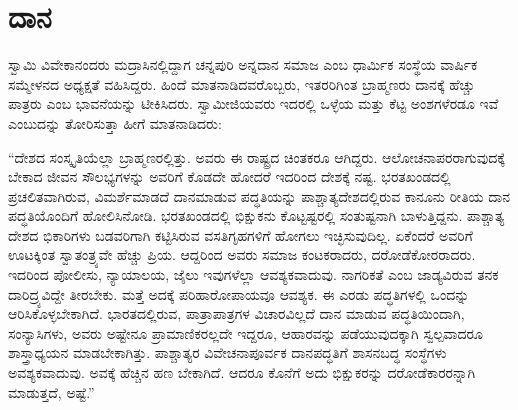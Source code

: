 
\chapter{ದಾನ}

ಸ್ವಾಮಿ ವಿವೇಕಾನಂದರು ಮದ್ರಾಸಿನಲ್ಲಿದ್ದಾಗ ಚನ್ನಪುರಿ ಅನ್ನದಾನ ಸಮಾಜ ಎಂಬ ಧಾರ್ಮಿಕ ಸಂಸ್ಥೆಯ ವಾರ್ಷಿಕ ಸಮ್ಮೇಳನದ ಅಧ್ಯಕ್ಷತೆ ವಹಿಸಿದ್ದರು. ಹಿಂದೆ ಮಾತನಾಡಿದವರೊಬ್ಬರು, ಇತರರಿಗಿಂತ ಬ್ರಾಹ್ಮಣರು ದಾನಕ್ಕೆ ಹೆಚ್ಚು ಪಾತ್ರರು ಎಂಬ ಭಾವನೆಯನ್ನು ಟೀಕಿಸಿದರು. ಸ್ವಾಮೀಜಿಯವರು ಇದರಲ್ಲಿ ಒಳ್ಳೆಯ ಮತ್ತು ಕೆಟ್ಟ ಅಂಶಗಳೆರಡೂ ಇವೆ ಎಂಬುದನ್ನು ತೋರಿಸುತ್ತಾ ಹೀಗೆ ಮಾತನಾಡಿದರು:

“ದೇಶದ ಸಂಸ್ಕೃತಿಯೆಲ್ಲಾ ಬ್ರಾಹ್ಮಣರಲ್ಲಿತ್ತು. ಅವರು ಈ ರಾಷ್ಟ್ರದ ಚಿಂತಕರೂ ಆಗಿದ್ದರು. ಆಲೋಚನಾಪರರಾಗುವುದಕ್ಕೆ ಬೇಕಾದ ಜೀವನ ಸೌಲಭ್ಯಗಳನ್ನು ಅವರಿಗೆ ಕೊಡದೇ ಹೋದರೆ ಇದರಿಂದ ದೇಶಕ್ಕೆ ನಷ್ಟ. ಭರತಖಂಡದಲ್ಲಿ ಪ್ರಚಲಿತವಾಗಿರುವ, ವಿಮರ್ಶೆಮಾಡದೆ ದಾನಮಾಡುವ ಪದ್ಧತಿಯನ್ನು ಪಾಶ್ಚಾತ್ಯದೇಶದಲ್ಲಿರುವ ಕಾನೂನು ರೀತಿಯ ದಾನ ಪದ್ಧತಿಯೊಂದಿಗೆ ಹೋಲಿಸಿನೋಡಿ. ಭರತಖಂಡದಲ್ಲಿ ಭಿಕ್ಷುಕನು ಕೊಟ್ಟಷ್ಟರಲ್ಲಿ ಸಂತುಷ್ಟನಾಗಿ ಬಾಳುತ್ತಿದ್ದನು. ಪಾಶ್ಚಾತ್ಯ ದೇಶದ ಭಿಕಾರಿಗಳು ಬಡವರಿಗಾಗಿ ಕಟ್ಟಿಸಿರುವ ವಸತಿಗೃಹಗಳಿಗೆ ಹೋಗಲು ಇಚ್ಛಿಸುವುದಿಲ್ಲ. ಏಕೆಂದರೆ ಅವರಿಗೆ ಊಟಕ್ಕಿಂತ ಸ್ವಾತಂತ್ರ್ಯವೇ ಹೆಚ್ಚು ಪ್ರಿಯ. ಆದ್ದರಿಂದ ಅವರು ಸಮಾಜ ಕಂಟಕರಾದರು, ದರೋಡೆಕೋರರಾದರು. ಇದರಿಂದ ಪೋಲೀಸು, ನ್ಯಾಯಾಲಯ, ಜೈಲು ಇವುಗಳೆಲ್ಲಾ ಆವಶ್ಯಕವಾದುವು. ನಾಗರಿಕತೆ ಎಂಬ ಜಾಡ್ಯವಿರುವ ತನಕ ದಾರಿದ್ರ್ಯವಿದ್ದೇ ತೀರಬೇಕು. ಮತ್ತೆ ಅದಕ್ಕೆ ಪರಿಹಾರೋಪಾಯವೂ ಆವಶ್ಯಕ. ಈ ಎರಡು ಪದ್ಧತಿಗಳಲ್ಲಿ ಒಂದನ್ನು ಆರಿಸಿಕೊಳ್ಳಬೇಕಾಗಿದೆ. ಭಾರತದಲ್ಲಿರುವ, ಪಾತ್ರಾಪಾತ್ರಗಳ ವಿಚಾರವಿಲ್ಲದೆ ದಾನ ಮಾಡುವ ಪದ್ಧತಿಯಿಂದಾಗಿ, ಸಂನ್ಯಾಸಿಗಳು, ಅವರು ಅಷ್ಟೇನೂ ಪ್ರಾಮಾಣಿಕರಲ್ಲದೇ ಇದ್ದರೂ, ಆಹಾರವನ್ನು ಪಡೆಯುವುದಕ್ಕಾಗಿ ಸ್ವಲ್ಪವಾದರೂ ಶಾಸ್ತ್ರಾಧ್ಯಯನ ಮಾಡಬೇಕಾಗಿತ್ತು. ಪಾಶ್ಚಾತ್ಯರ ವಿವೇಚನಾಪೂರ್ವಕ ದಾನಪದ್ಧತಿಗೆ ಶಾಸನಬದ್ಧ ಸಂಸ್ಧೆಗಳು ಅವಶ್ಯಕವಾದುವು. ಅವಕ್ಕೆ ಹೆಚ್ಚಿನ ಹಣ ಬೇಕಾಗಿದೆ. ಆದರೂ ಕೊನೆಗೆ ಅದು ಭಿಕ್ಷುಕರನ್ನು ದರೋಡೆಕಾರರನ್ನಾಗಿ ಮಾಡುತ್ತದೆ, ಅಷ್ಟೆ.”

